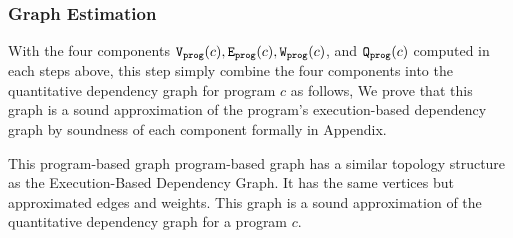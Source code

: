 \subsubsection{Graph Estimation}
   \label{sec:alg_graphgen}
   With the four components $\mathtt{{V_{prog}}}(c), \mathtt{{E_{prog}}}(c), \mathtt{{W_{prog}}}(c)$, and $\mathtt{{Q_{prog}}}(c)$
   computed in each steps above, this step simply combine the four components into the quantitative dependency graph for program $c$ as follows,
   \highlight{
     \[
       \progG(c) = (\progV(c), \progE(c), \progW(c), \progF(c)).
       \]
   }
   We prove that this graph is a sound approximation of the program's execution-based dependency graph by soundness of each component formally in Appendix.

This program-based graph program-based graph has a similar topology structure as 
the Execution-Based Dependency Graph. It has the same
vertices 
but approximated edges and weights.  
This graph is a sound approximation of the quantitative dependency graph for a program $c$.

